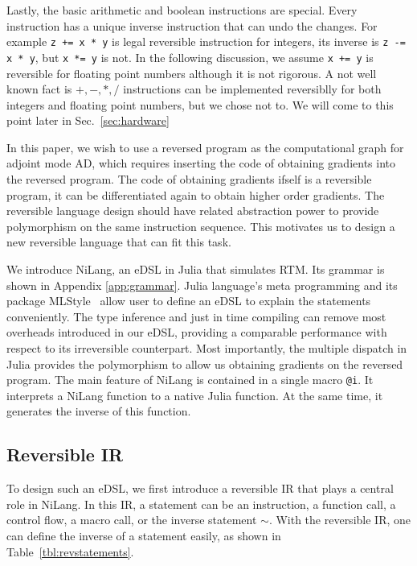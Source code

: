 \documentclass[aps,twocolumn,longbibliography,english,superscriptaddress]{revtex4-1}
\newcommand{\<}{\langle}
\renewcommand{\>}{\rangle}
\newcommand{\Tbl}[1]{Table~\ref{#1}}
\newcommand{\Sec}[1]{Sec.~\ref{#1}}
\newcommand{\App}[1]{Appendix \ref{#1}}
\theoremstyle{definition}\newtheorem{definition}{\textit{Definition}}
\begin{document}
Lastly, the basic arithmetic and boolean instructions are special. Every instruction has a unique inverse instruction that can undo the changes.
For example \texttt{z += x * y} is legal reversible instruction for integers, its inverse is \texttt{z -= x * y}, but \texttt{x *= y} is not.
In the following discussion, we assume \texttt{x += y} is reversible for floating point numbers although it is not rigorous.
A not well known fact is $+, -, *, /$ instructions can be implemented reversiblly for both integers and floating point numbers, but we chose not to.
We will come to this point later in \Sec{sec:hardware}

In this paper, we wish to use a reversed program as the computational graph for adjoint mode AD, which requires inserting the code of obtaining gradients into the reversed program.
The code of obtaining gradients ifself is a reversible program, it can be differentiated again to obtain higher order gradients.
The reversible language design should have related abstraction power to provide polymorphism on the same instruction sequence.
This motivates us to design a new reversible language that can fit this task.

We introduce NiLang, an eDSL in Julia that simulates RTM. Its grammar is shown in \App{app:grammar}.
Julia language's meta programming and its package MLStyle~\cite{MLStyle} allow user to define an eDSL to explain the statements conveniently.
The type inference and just in time compiling can remove most overheads introduced in our eDSL, providing a comparable performance with respect to its irreversible counterpart. Most importantly, the multiple dispatch in Julia provides the polymorphism to allow us obtaining gradients on the reversed program.
The main feature of NiLang is contained in a single macro \texttt{@i}. It interprets a NiLang function to a native Julia function.
At the same time, it generates the inverse of this function.

\subsection{Reversible IR}
To design such an eDSL, we first introduce a reversible IR that plays a central role in NiLang.
In this IR, a statement can be an instruction, a function call, a control flow, a macro call, or the inverse statement $\sim$.
With the reversible IR, one can define the inverse of a statement easily, as shown in \Tbl{tbl:revstatements}.
\end{document}
